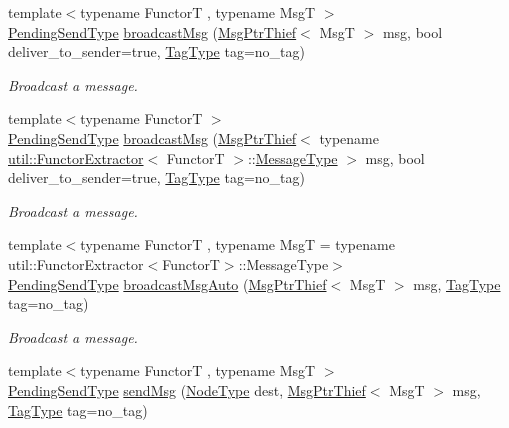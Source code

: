 \begin{DoxyCompactItemize}
{\footnotesize template$<$typename FunctorT , typename MsgT $>$ }\\\hyperlink{structvt_1_1messaging_1_1_active_messenger_a3626a6ca76d8ad4ec7c3b47a2c70d3a8}{Pending\+Send\+Type} \hyperlink{group__functorsend_ga880e93f0c239c1aa9c9ade805d75dd7a}{broadcast\+Msg} (\hyperlink{structvt_1_1messaging_1_1_msg_ptr_thief}{Msg\+Ptr\+Thief}$<$ MsgT $>$ msg, bool deliver\+\_\+to\+\_\+sender=true, \hyperlink{namespacevt_a84ab281dae04a52a4b243d6bf62d0e52}{Tag\+Type} tag=no\+\_\+tag)
\begin{DoxyCompactList}\small\item\em Broadcast a message. \end{DoxyCompactList}\item 
{\footnotesize template$<$typename FunctorT $>$ }\\\hyperlink{structvt_1_1messaging_1_1_active_messenger_a3626a6ca76d8ad4ec7c3b47a2c70d3a8}{Pending\+Send\+Type} \hyperlink{group__functorsend_gab47c5e564a5f8e286568cdb82b41c488}{broadcast\+Msg} (\hyperlink{structvt_1_1messaging_1_1_msg_ptr_thief}{Msg\+Ptr\+Thief}$<$ typename \hyperlink{structvt_1_1util_1_1_functor_extractor}{util\+::\+Functor\+Extractor}$<$ FunctorT $>$\+::\hyperlink{structvt_1_1messaging_1_1_active_messenger_a720a2b1e7462d414b2a51d9fe005eca9}{Message\+Type} $>$ msg, bool deliver\+\_\+to\+\_\+sender=true, \hyperlink{namespacevt_a84ab281dae04a52a4b243d6bf62d0e52}{Tag\+Type} tag=no\+\_\+tag)
\begin{DoxyCompactList}\small\item\em Broadcast a message. \end{DoxyCompactList}\item 
{\footnotesize template$<$typename FunctorT , typename MsgT  = typename util\+::\+Functor\+Extractor$<$\+Functor\+T$>$\+::\+Message\+Type$>$ }\\\hyperlink{structvt_1_1messaging_1_1_active_messenger_a3626a6ca76d8ad4ec7c3b47a2c70d3a8}{Pending\+Send\+Type} \hyperlink{group__functorsend_ga9337b80d48503a52676f80f86bc66cf2}{broadcast\+Msg\+Auto} (\hyperlink{structvt_1_1messaging_1_1_msg_ptr_thief}{Msg\+Ptr\+Thief}$<$ MsgT $>$ msg, \hyperlink{namespacevt_a84ab281dae04a52a4b243d6bf62d0e52}{Tag\+Type} tag=no\+\_\+tag)
\begin{DoxyCompactList}\small\item\em Broadcast a message. \end{DoxyCompactList}\item 
{\footnotesize template$<$typename FunctorT , typename MsgT $>$ }\\\hyperlink{structvt_1_1messaging_1_1_active_messenger_a3626a6ca76d8ad4ec7c3b47a2c70d3a8}{Pending\+Send\+Type} \hyperlink{group__functorsend_gaab0dc380a72f038f4fc2350ba89de98f}{send\+Msg} (\hyperlink{namespacevt_a866da9d0efc19c0a1ce79e9e492f47e2}{Node\+Type} dest, \hyperlink{structvt_1_1messaging_1_1_msg_ptr_thief}{Msg\+Ptr\+Thief}$<$ MsgT $>$ msg, \hyperlink{namespacevt_a84ab281dae04a52a4b243d6bf62d0e52}{Tag\+Type} tag=no\+\_\+tag)

\end{DoxyCompactItemize}
